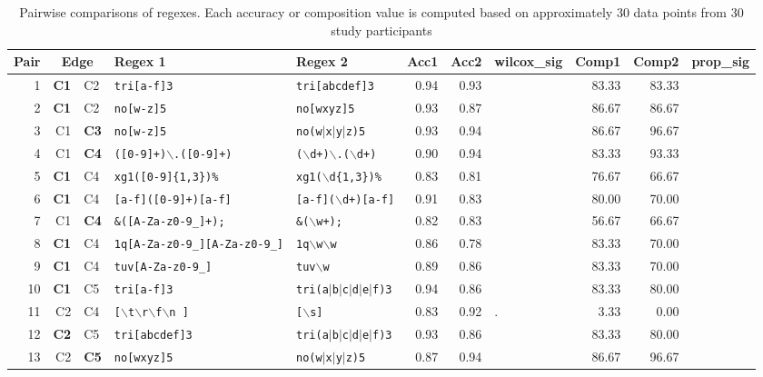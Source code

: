 \begin{table*}[ht]
\centering
\caption{Pairwise comparisons of regexes. Each accuracy or composition value is computed based on approximately 30 data points from 30 study participants}
\begin{tabular}{rr@{ -- }lllrrlrrl}
  \hline
 Pair & \multicolumn{2}{c}{Edge} & Regex 1 & Regex 2 & Acc1 & Acc2 & wilcox\_sig & Comp1 & Comp2 & prop\_sig \\ 
  \hline
1 & {\bf C1} & C2 & {\tt tri[a-f]3} & {\tt tri[abcdef]3} & 0.94 & 0.93 &   & 83.33 & 83.33 &   \\ 
  2 & {\bf C1} & C2 & {\tt no[w-z]5} & {\tt no[wxyz]5} & 0.93 & 0.87 &   & 86.67 & 86.67 &   \\ 
  3 & C1 & {\bf C3} & {\tt no[w-z]5} & {\tt no(w$|$x$|$y$|$z)5} & 0.93 & 0.94 &   & 86.67 & 96.67 &   \\ 
  4 & C1 & {\bf C4} & {\tt ([0-9]+)$\backslash$.([0-9]+)} & {\tt ($\backslash$d+)$\backslash$.($\backslash$d+)} & 0.90 & 0.94 &   & 83.33 & 93.33 &   \\ 
  5 & {\bf C1} & C4 & {\tt xg1([0-9]\{1,3\})\%} & {\tt xg1($\backslash$d\{1,3\})\%} & 0.83 & 0.81 &   & 76.67 & 66.67 &   \\ 
  6 & {\bf C1} & C4 & {\tt [a-f]([0-9]+)[a-f]} & {\tt [a-f]($\backslash$d+)[a-f]} & 0.91 & 0.83 &   & 80.00 & 70.00 &   \\ 
  7 & C1 & {\bf C4} & {\tt \&([A-Za-z0-9\_]+);} & {\tt \&($\backslash$w+);} & 0.82 & 0.83 &   & 56.67 & 66.67 &   \\ 
  8 & {\bf C1} & C4 & {\tt 1q[A-Za-z0-9\_][A-Za-z0-9\_]} & {\tt 1q$\backslash$w$\backslash$w} & 0.86 & 0.78 &   & 83.33 & 70.00 &   \\ 
  9 & {\bf C1} & C4 & {\tt tuv[A-Za-z0-9\_]} & {\tt tuv$\backslash$w} & 0.89 & 0.86 &   & 83.33 & 70.00 &   \\ 
    10 & {\bf C1} & C5 & {\tt tri[a-f]3} & {\tt tri(a$|$b$|$c$|$d$|$e$|$f)3} & 0.94 & 0.86 &   & 83.33 & 80.00 &   \\ 
  11 & C2 & C4 & {\tt [$\backslash$t$\backslash$r$\backslash$f$\backslash$n ]} & {\tt [$\backslash$s]} & 0.83 & 0.92 & . & 3.33 & 0.00 &   \\ 
  12 & {\bf C2} & C5 & {\tt tri[abcdef]3} & {\tt tri(a$|$b$|$c$|$d$|$e$|$f)3} & 0.93 & 0.86 &   & 83.33 & 80.00 &   \\ 
  13 & C2 & {\bf C5} & {\tt no[wxyz]5} & {\tt no(w$|$x$|$y$|$z)5} & 0.87 & 0.94 &   & 86.67 & 96.67 &   \\ 

\end{tabular}
\end{table*}
